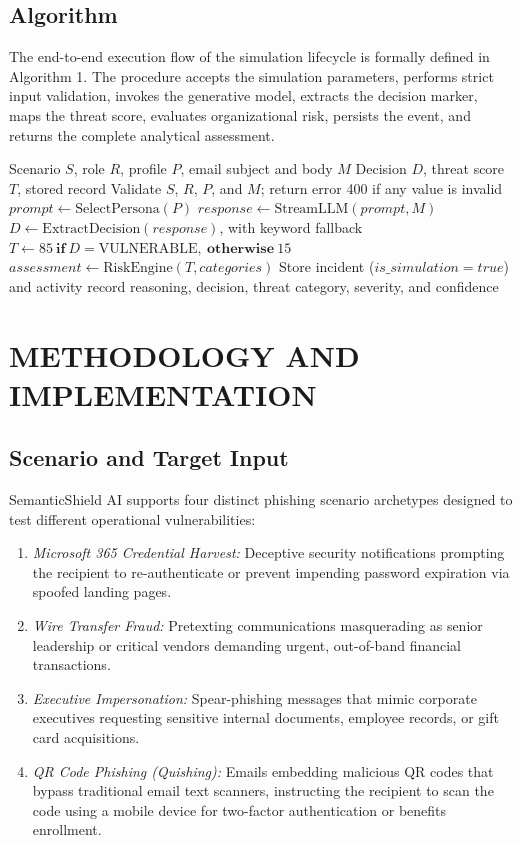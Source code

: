 \documentclass[conference,letterpaper]{IEEEtran}
\begin{document}
\subsection{Algorithm}
The end-to-end execution flow of the simulation lifecycle is formally defined in Algorithm 1. The procedure accepts the simulation parameters, performs strict input validation, invokes the generative model, extracts the decision marker, maps the threat score, evaluates organizational risk, persists the event, and returns the complete analytical assessment.

\begin{algorithm}[t]
\caption{Processing a simulation request}
\label{alg:simulation}
\begin{algorithmic}[1]
\Require Scenario $S$, role $R$, profile $P$, email subject and body $M$
\Ensure Decision $D$, threat score $T$, stored record
\State Validate $S$, $R$, $P$, and $M$; return error 400 if any value is invalid
\State $prompt \gets \mathrm{SelectPersona}(P)$
\State $response \gets \mathrm{StreamLLM}(prompt, M)$
\State $D \gets \mathrm{ExtractDecision}(response)$, with keyword fallback
\State $T \gets 85\ \mathbf{if}\ D = \mathrm{VULNERABLE},\ \mathbf{otherwise}\ 15$
\State $assessment \gets \mathrm{RiskEngine}(T, categories)$
\State Store incident ($is\_simulation = true$) and activity record
\State \Return reasoning, decision, threat category, severity, and confidence
\end{algorithmic}
\end{algorithm}

\section{METHODOLOGY AND IMPLEMENTATION}

\subsection{Scenario and Target Input}
SemanticShield AI supports four distinct phishing scenario archetypes designed to test different operational vulnerabilities:
\begin{enumerate}
    \item \textit{Microsoft 365 Credential Harvest:} Deceptive security notifications prompting the recipient to re-authenticate or prevent impending password expiration via spoofed landing pages.
    \item \textit{Wire Transfer Fraud:} Pretexting communications masquerading as senior leadership or critical vendors demanding urgent, out-of-band financial transactions.
    \item \textit{Executive Impersonation:} Spear-phishing messages that mimic corporate executives requesting sensitive internal documents, employee records, or gift card acquisitions.
    \item \textit{QR Code Phishing (Quishing):} Emails embedding malicious QR codes that bypass traditional email text scanners, instructing the recipient to scan the code using a mobile device for two-factor authentication or benefits enrollment.
\end{enumerate}
\end{document}
